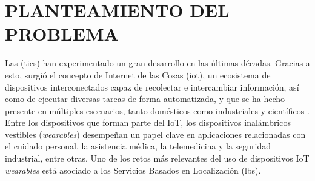 \section{PLANTEAMIENTO DEL PROBLEMA}
\label{ch:planteamiento}

Las (\gls{tics}) han experimentado un gran desarrollo en las últimas décadas. Gracias a esto, surgió el concepto de Internet de las Cosas (\gls{iot}), un ecosistema de dispositivos interconectados capaz de recolectar e intercambiar información, así como de ejecutar diversas tareas de forma automatizada, y que se ha hecho presente en múltiples escenarios, tanto domésticos como industriales y científicos \cite{ref1, ref2}. Entre los dispositivos que forman parte del IoT, los dispositivos inalámbricos vestibles (\textit{wearables}) desempeñan un papel clave en aplicaciones relacionadas con el cuidado personal, la asistencia médica, la telemedicina y la seguridad industrial, entre otras. Uno de los retos más relevantes del uso de dispositivos IoT \textit{wearables} está asociado a los Servicios Basados en Localización (\gls{lbs}).

